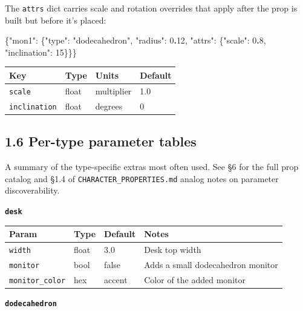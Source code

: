 \documentclass[
  12pt,
  letterpaper,
]{book}
\newenvironment{Shaded}{}{}
\newcommand{\DataTypeTok}[1]{\textcolor[rgb]{0.56,0.13,0.00}{#1}}
\newcommand{\DecValTok}[1]{\textcolor[rgb]{0.25,0.63,0.44}{#1}}
\newcommand{\ErrorTok}[1]{\textcolor[rgb]{1.00,0.00,0.00}{\textbf{#1}}}
\newcommand{\FunctionTok}[1]{\textcolor[rgb]{0.02,0.16,0.49}{#1}}
\newcommand{\StringTok}[1]{\textcolor[rgb]{0.25,0.44,0.63}{#1}}
\begin{document}
The \texttt{attrs} dict carries scale and rotation overrides that apply
after the prop is built but before it's placed:

\begin{Shaded}
\begin{Highlighting}[]
\FunctionTok{\{}\DataTypeTok{"mon1"}\FunctionTok{:} \FunctionTok{\{}\DataTypeTok{"type"}\FunctionTok{:} \StringTok{"dodecahedron"}\FunctionTok{,} \DataTypeTok{"radius"}\FunctionTok{:} \DecValTok{0}\ErrorTok{.}\DecValTok{12}\FunctionTok{,}
          \DataTypeTok{"attrs"}\FunctionTok{:} \FunctionTok{\{}\DataTypeTok{"scale"}\FunctionTok{:} \DecValTok{0}\ErrorTok{.}\DecValTok{8}\FunctionTok{,} \DataTypeTok{"inclination"}\FunctionTok{:} \DecValTok{15}\FunctionTok{\}\}\}}
\end{Highlighting}
\end{Shaded}

\begin{longtable}[]{@{}llll@{}}
\toprule\noalign{}
Key & Type & Units & Default \\
\midrule\noalign{}
\endhead
\bottomrule\noalign{}
\endlastfoot
\texttt{scale} & float & multiplier & 1.0 \\
\texttt{inclination} & float & degrees & 0 \\
\end{longtable}

\subsection{1.6 Per-type parameter
tables}\label{per-type-parameter-tables}

A summary of the type-specific extras most often used. See §6 for the
full prop catalog and §1.4 of \texttt{CHARACTER\_PROPERTIES.md} analog
notes on parameter discoverability.

\textbf{\texttt{desk}}

\begin{longtable}[]{@{}llll@{}}
\toprule\noalign{}
Param & Type & Default & Notes \\
\midrule\noalign{}
\endhead
\bottomrule\noalign{}
\endlastfoot
\texttt{width} & float & 3.0 & Desk top width \\
\texttt{monitor} & bool & false & Adds a small dodecahedron monitor \\
\texttt{monitor\_color} & hex & accent & Color of the added monitor \\
\end{longtable}

\textbf{\texttt{dodecahedron}}
\end{document}
